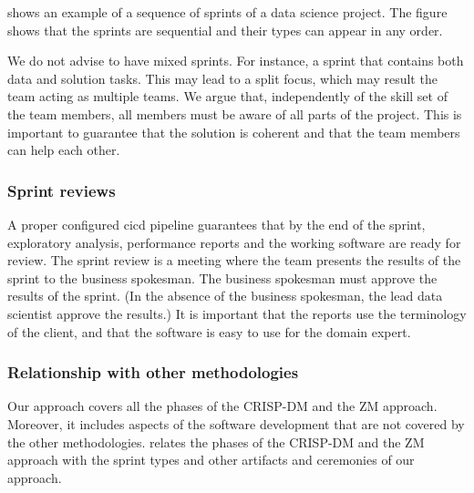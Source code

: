  shows an example of a sequence of sprints of a data science project.
The figure shows that the sprints are sequential and their types can appear in
any order.

We do not advise to have mixed sprints.  For instance, a sprint that contains both data
and solution tasks.  This may lead to a split focus, which may result the team acting
as multiple teams.  We argue that, independently of the skill set of the team members,
all members must be aware of all parts of the project.  This is important to guarantee
that the solution is coherent and that the team members can help each other.

\subsubsection{Sprint reviews}

A proper configured \gls{cicd} pipeline guarantees that by the end of the sprint,
exploratory analysis, performance reports and the working software are ready for review.
The sprint review is a meeting where the team presents the results of the sprint to the
business spokesman.  The business spokesman must approve the results of the sprint.
(In the absence of the business spokesman, the lead data scientist approve the results.)
It is important that the reports use the terminology of the client, and that the
software is easy to use for the domain expert.


\subsubsection{Relationship with other methodologies}

Our approach covers all the phases of the CRISP-DM and the ZM approach.  Moreover, it
includes aspects of the software development that are not covered by the other
methodologies.  relates the phases of the CRISP-DM and the ZM approach
with the sprint types and other artifacts and ceremonies of our approach.

